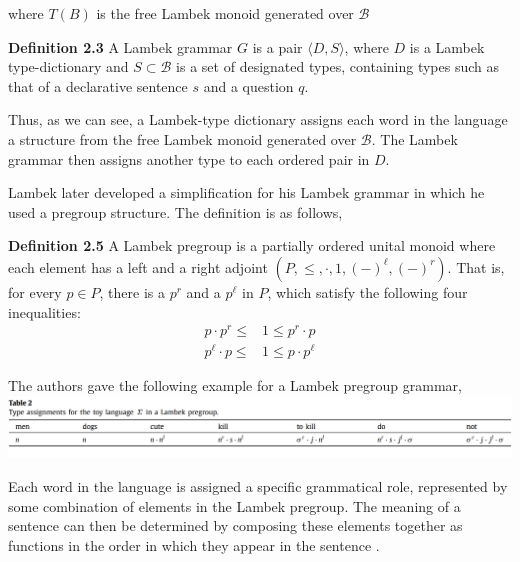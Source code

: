 \documentclass[11pt, reqno]{amsart}
\theoremstyle{plain}
\theoremstyle{definition}
\theoremstyle{example}
\begin{document}
where $T(B)$ is the free Lambek monoid generated over $\mathcal{B}$

\par
\textbf{Definition 2.3} \cite[\S 2.1]{lambekvlambek} A Lambek grammar $G$ is a pair $\langle D, S \rangle$, where $D$ is a Lambek type-dictionary and $S \subset \mathcal{B}$ is a set of designated types, containing types such as that of a declarative sentence $s$ and a question $q$.

\par
Thus, as we can see, a Lambek-type dictionary assigns each word in the language a structure from the free Lambek monoid generated over $\mathcal{B}$. The Lambek grammar then assigns another type to each ordered pair in $D$.

\par
Lambek later developed a simplification for his Lambek grammar in which he used a pregroup structure. The definition is as follows,

\par
\textbf{Definition 2.5} \cite[\S 2.1.1]{lambekvlambek} A Lambek pregroup is a partially ordered unital monoid where each element has a left and a right adjoint $(P, \leq, \cdot, 1, (-)^{\ell}, (-)^r)$. That is, for every $p \in P$, there is a $p^r$ and a $p^{\ell}$ in $P$, which satisfy the following four inequalities:
\begin{align*}
p \cdot p^r \leq &1 \leq p^r \cdot p\\
p^{\ell} \cdot p \leq &1 \leq p \cdot p^{\ell}
\end{align*}

\par
The authors gave the following example for a Lambek pregroup grammar,\\
\includegraphics[scale=0.55]{lambek_pregroup}

\par
Each word in the language is assigned a specific grammatical role, represented by some combination of elements in the Lambek pregroup. The meaning of a sentence can then be determined by composing these elements together as functions in the order in which they appear in the sentence \cite[\S 2.1.1]{lambekvlambek}.
\end{document}
